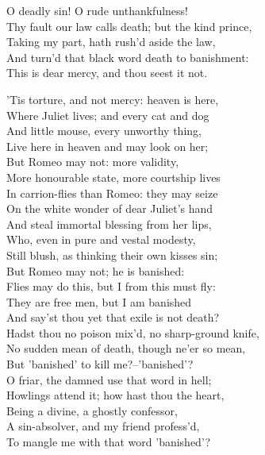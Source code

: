 \begin{speech}
O deadly sin! O rude unthankfulness! \\
Thy fault our law calls death; but the kind prince, \\
Taking my part, hath rush'd aside the law, \\
And turn'd that black word death to banishment: \\
This is dear mercy, and thou seest it not. \\
\end{speech}
\begin{speech}
'Tis torture, and not mercy: heaven is here, \\
Where Juliet lives; and every cat and dog \\
And little mouse, every unworthy thing, \\
Live here in heaven and may look on her; \\
But Romeo may not: more validity, \\
More honourable state, more courtship lives \\
In carrion-flies than Romeo: they may seize \\
On the white wonder of dear Juliet's hand \\
And steal immortal blessing from her lips, \\
Who, even in pure and vestal modesty, \\
Still blush, as thinking their own kisses sin; \\
But Romeo may not; he is banished: \\
Flies may do this, but I from this must fly: \\
They are free men, but I am banished \\
And say'st thou yet that exile is not death? \\
Hadst thou no poison mix'd, no sharp-ground knife, \\
No sudden mean of death, though ne'er so mean, \\
But 'banished' to kill me?--'banished'? \\
O friar, the damned use that word in hell; \\
Howlings attend it; how hast thou the heart, \\
Being a divine, a ghostly confessor, \\
A sin-absolver, and my friend profess'd, \\
To mangle me with that word 'banished'? \\
\end{speech}
